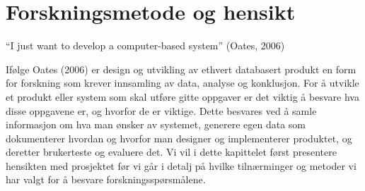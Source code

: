 \chapter{Forskningsmetode og hensikt}
\label{chp:forskningsmetode}

“I just want to develop a computer-based system” (Oates, 2006)

\noindent
Ifølge Oates (2006) er design og utvikling av ethvert databasert produkt en form for forskning som krever innsamling av data, analyse og konklusjon. For å utvikle et produkt eller system som skal utføre gitte oppgaver er det viktig å besvare hva disse oppgavene er, og hvorfor de er viktige. Dette besvares ved å samle informasjon om hva man ønsker av systemet, generere egen data som dokumenterer hvordan og hvorfor man designer og implementerer produktet, og deretter brukerteste og evaluere det. Vi vil i dette kapittelet først presentere hensikten med prosjektet før vi går i detalj på hvilke tilnærminger og metoder vi har valgt for å besvare forskningsspørsmålene.

